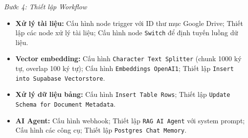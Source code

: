 \textit{Bước 4: Thiết lập Workflow}
\begin{itemize}
    \item \textbf{Xử lý tài liệu:} Cấu hình node trigger với ID thư mục Google Drive; Thiết lập các node xử lý tài liệu; Cấu hình node \texttt{Switch} để định tuyến luồng dữ liệu.
    
    \item \textbf{Vector embedding:} Cấu hình \texttt{Character Text Splitter} (chunk 1000 ký tự, overlap 100 ký tự); Cấu hình \texttt{Embeddings OpenAI1}; Thiết lập \texttt{Insert into Supabase Vectorstore}.
    
    \item \textbf{Xử lý dữ liệu bảng:} Cấu hình \texttt{Insert Table Rows}; Thiết lập \texttt{Update Schema for Document Metadata}.
    
    \item \textbf{AI Agent:} Cấu hình webhook; Thiết lập \texttt{RAG AI Agent} với system prompt; Cấu hình các công cụ; Thiết lập \texttt{Postgres Chat Memory}.
\end{itemize}

